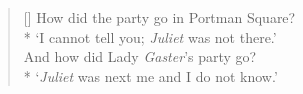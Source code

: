 \documentclass[MAIN]{subfiles}
\begin{document}
\begin{verse}[\versewidth]
How did the party go in {\sc Portman Square}?\\*
`I cannot tell you; \emph{Juliet} was not there.'\\
And how did Lady \emph{Gaster}'s party go?\\*
`\emph{Juliet} was next me and I do not know.'
\end{verse}
\end{document}
